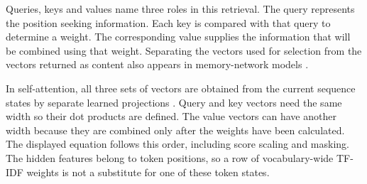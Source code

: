 \documentclass[10pt,letterpaper]{article}
\begin{document}
Queries, keys and values name three roles in this retrieval. The query represents the position seeking information. Each key is compared with that query to determine a weight. The corresponding value supplies the information that will be combined using that weight. Separating the vectors used for selection from the vectors returned as content also appears in memory-network models \cite{memory}.\par

In self-attention, all three sets of vectors are obtained from the current sequence states by separate learned projections \cite{transformer}. Query and key vectors need the same width so their dot products are defined. The value vectors can have another width because they are combined only after the weights have been calculated. The displayed equation follows this order, including score scaling and masking. The hidden features belong to token positions, so a row of vocabulary-wide TF-IDF weights is not a substitute for one of these token states.\par
\end{document}
